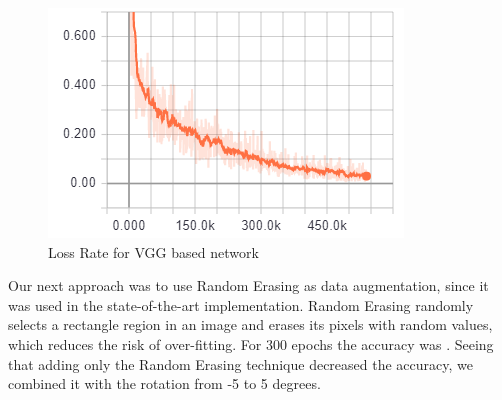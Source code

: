 \documentclass[twoside,twocolumn]{article}
\begin{document}
    
    \begin{figure}[h]
    \begin{center}
		\includegraphics[scale=0.6]{lossRateVGG.png}
        \caption{Loss Rate for VGG based network\label{fig:lossRateVGG}}    
    \end{center}
    \end{figure}
    
    Our next approach was to use Random Erasing as data augmentation, since it was used in the state-of-the-art implementation. Random Erasing randomly
selects a rectangle region in an image and erases its pixels with random values, which reduces the risk of over-fitting. For 300 epochs the accuracy was . Seeing that adding only the Random Erasing technique decreased the accuracy, we combined it with the rotation from -5 to 5 degrees.
    
    





\end{document}
